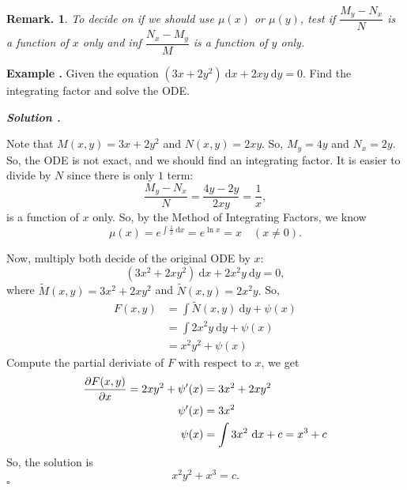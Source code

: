 \documentclass[12pt, a4paper]{article}
\newcounter{index}[subsection]
\newenvironment*{eg}{\begin{framed}\par\noindent\textbf{Example \thesubsection.\stepcounter{index}\theindex}}{\par\end{framed}}
\newcounter{nprf}[subsection]
\newenvironment*{sol}{\par\indent\textbf{\textit{Solution \stepcounter{nprf}\thenprf.}}\par}{\hfill{$\square$}\par}
\newtheorem*{rmk}{Remark.}
\def\d{{\mathrm{d}}}
\begin{document}
\begin{rmk} To decide on if we should use $\mu(x)$ or $\mu(y)$, test if $\dfrac{M_y-N_x}{N}$ is a function of $x$ only and inf $\dfrac{N_x-M_y}{M}$ is a function of $y$ only.\end{rmk}
\begin{eg}
	Given the equation $(3x+2y^2)\ \d{x}+2xy\ \d{y}=0$. Find the integrating factor and solve the ODE.
	\begin{sol}
		Note that $M(x,y)=3x+2y^2$ and $N(x,y)=2xy$. So, $M_y=4y$ and $N_x=2y$. So, the ODE is not exact, and we should find an integrating factor. It is easier to divide by $N$ since there is only $1$ term: \[\dfrac{M_y-N_x}{N}=\dfrac{4y-2y}{2xy}=\dfrac{1}{x},\] is a function of $x$ only. So, by the Method of Integrating Factors, we know \[\mu(x)=e^{\int\frac{1}{x}\ \d{x}}=e^{\ln{x}}=x\quad(x\neq0).\]\par 
		Now, multiply both decide of the original ODE by $x$: \[(3x^2+2xy^2)\ \d{x}+2x^2y\ \d{y}=0,\] where $\widetilde{M}(x,y)=3x^2+2xy^2$ and $\widetilde{N}(x,y)=2x^2y.$ So, \begin{align*}F(x,y)&=\int\widetilde{N}(x,y)\ \d{y}+\psi(x)\\&=\int 2x^2y\ \d{y}+\psi(x)\\&=x^2y^2+\psi(x)\end{align*} Compute the partial deriviate of $F$ with respect to $x$, we get\begin{align*}\pdv{F(x,y)}{x}=2xy^2+\psi'(x)&=3x^2+2xy^2\\\psi'(x)&=3x^2\\\psi(x)&=\int 3x^2\ \d{x}+c=x^3+c\end{align*} So, the solution is \[x^2y^2+x^3=c.\]
	\end{sol}
\end{eg}
\end{document}
